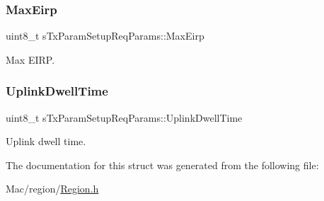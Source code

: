 \subsubsection{\texorpdfstring{Max\+Eirp}{MaxEirp}}
{\footnotesize\ttfamily uint8\+\_\+t s\+Tx\+Param\+Setup\+Req\+Params\+::\+Max\+Eirp}

Max E\+I\+RP. \mbox{\label{structsTxParamSetupReqParams_acf7e71d1e93e19932949aff6e507f085}} 
\subsubsection{\texorpdfstring{Uplink\+Dwell\+Time}{UplinkDwellTime}}
{\footnotesize\ttfamily uint8\+\_\+t s\+Tx\+Param\+Setup\+Req\+Params\+::\+Uplink\+Dwell\+Time}

Uplink dwell time. 

The documentation for this struct was generated from the following file\+:\begin{DoxyCompactItemize}
\item 
Mac/region/\hyperlink{Region_8h}{Region.\+h}\end{DoxyCompactItemize}
